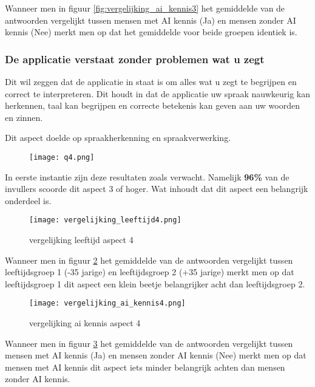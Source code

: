 Wanneer men in figuur \ref{fig:vergelijking_ai_kennis3} het gemiddelde van de antwoorden vergelijkt tussen mensen met AI kennis (Ja) en mensen zonder AI kennis (Nee) merkt men op dat het gemiddelde voor beide groepen identiek is.

\newpage

\subsubsection{De applicatie verstaat zonder problemen wat u zegt}

Dit wil zeggen dat de applicatie in staat is om alles wat u zegt te begrijpen en correct te interpreteren. Dit houdt in dat de applicatie uw spraak nauwkeurig kan herkennen, taal kan begrijpen en correcte betekenis kan geven aan uw woorden en zinnen.

Dit aspect doelde op spraakherkenning en spraakverwerking.

\begin{figure}[htbp]
    \centering
    \texttt{[image: q4.png]}
    \label{fig:vraag_4_resultaat}
\end{figure}

In eerste instantie zijn deze resultaten zoals verwacht. Namelijk \textbf{96\%} van de invullers scoorde dit aspect 3 of hoger. Wat inhoudt dat dit aspect een belangrijk onderdeel is.

\begin{figure}[htbp]
    \centering
    \texttt{[image: vergelijking\_leeftijd4.png]}
    \caption{vergelijking leeftijd aspect 4}
    \label{fig:vergelijking_leeftijd4}
\end{figure}

Wanneer men in figuur \ref{fig:vergelijking_leeftijd4} het gemiddelde van de antwoorden vergelijkt tussen leeftijdsgroep 1 (-35 jarige) en leeftijdsgroep 2 (+35 jarige) merkt men op dat leeftijdsgroep 1 dit aspect een klein beetje belangrijker acht dan leeftijdsgroep 2.

\newpage

\begin{figure}[htbp]
    \centering
    \texttt{[image: vergelijking\_ai\_kennis4.png]}
    \caption{vergelijking ai kennis aspect 4}
    \label{fig:vergelijking_ai_kennis4}
\end{figure}

Wanneer men in figuur \ref{fig:vergelijking_ai_kennis4} het gemiddelde van de antwoorden vergelijkt tussen mensen met AI kennis (Ja) en mensen zonder AI kennis (Nee) merkt men op dat mensen met AI kennis dit aspect iets minder belangrijk achten dan mensen zonder AI kennis.

